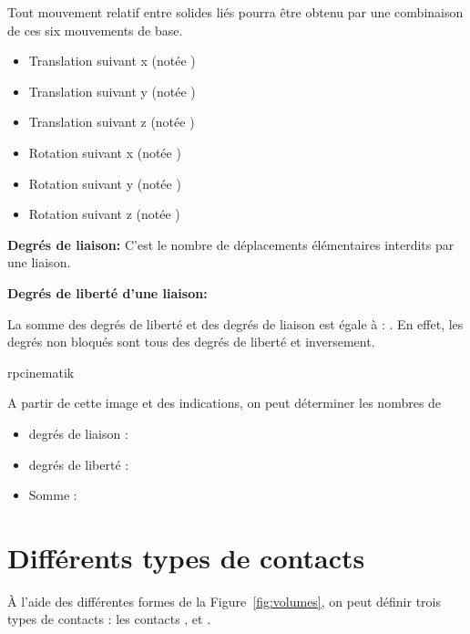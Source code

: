 \documentclass[10pt,fleqn,draft]{article} %
\begin{document}
Tout mouvement  relatif  entre  solides  liés  pourra  être  obtenu  par  une  combinaison de  ces  six  mouvements  de base.

\begin{itemize}
    \item Translation suivant x (notée )
    \item Translation suivant y (notée )
    \item Translation suivant z (notée )
    \item Rotation suivant x (notée )
    \item Rotation suivant y (notée )
    \item Rotation suivant z (notée )
\end{itemize}


\begin{defi}
\textbf{Degrés de liaison:}
C'est le nombre de déplacements élémentaires interdits par 
une liaison.

 \textbf{ Degrés  de  liberté  d'une  liaison:}
  

La somme des degrés de liberté et des degrés de liaison est égale à : . 
En effet, les degrés non bloqués sont tous des degrés de liberté et inversement. 
\end{defi}
rpcinematik

\begin{exemple}
  A partir de cette image et des indications, on peut déterminer les nombres de \begin{itemize}
        \item degrés de liaison : 
        \item degrés de liberté : 
        \item Somme : 
  \end{itemize}
\end{exemple}


\section{Différents types de contacts}
\begin{aretenir}
  À l'aide des différentes formes de la Figure~\ref{fig:volumes}, on peut définir trois types de contacts : les contacts ,  et .
\end{aretenir}
\end{document}
